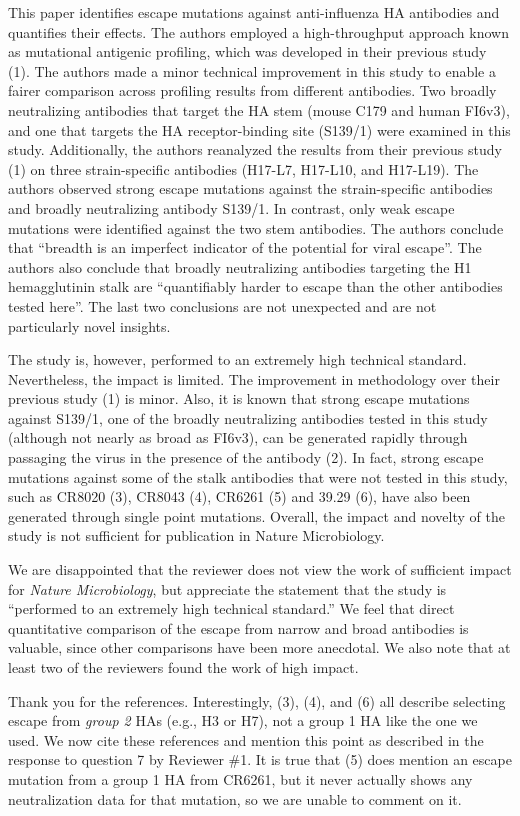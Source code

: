 \documentclass[11pt, oneside]{article}   	%
\begin{document}
This paper identifies escape mutations against anti-influenza HA antibodies and quantifies their effects. The authors employed a high-throughput approach known as mutational antigenic profiling, which was developed in their previous study (1). The authors made a minor technical improvement in this study to enable a fairer comparison across profiling results from different antibodies. Two broadly neutralizing antibodies that target the HA stem (mouse C179 and human FI6v3), and one that targets the HA receptor-binding site (S139/1) were examined in this study. Additionally, the authors reanalyzed the results from their previous study (1) on three strain-specific antibodies (H17-L7, H17-L10, and H17-L19). The authors observed strong escape mutations against the strain-specific antibodies and broadly neutralizing antibody S139/1. In contrast, only weak escape mutations were identified against the two stem antibodies. The authors conclude that ``breadth is an imperfect indicator of the potential for viral escape''. The authors also conclude that broadly neutralizing antibodies targeting the H1 hemagglutinin stalk are ``quantifiably harder to escape than the other antibodies tested here''. The last two conclusions are not unexpected and are not particularly novel insights.

The study is, however, performed to an extremely high technical standard. Nevertheless, the impact is limited. The improvement in methodology over their previous study (1) is minor. Also, it is known that strong escape mutations against S139/1, one of the broadly neutralizing antibodies tested in this study (although not nearly as broad as FI6v3), can be generated rapidly through passaging the virus in the presence of the antibody (2). In fact, strong escape mutations against some of the stalk antibodies that were not tested in this study, such as CR8020 (3), CR8043 (4), CR6261 (5) and 39.29 (6), have also been generated through single point mutations. Overall, the impact and novelty of the study is not sufficient for publication in Nature Microbiology. 

{\color{black}
We are disappointed that the reviewer does not view the work of sufficient impact for \textit{Nature Microbiology}, but appreciate the statement that the study is ``performed to an extremely high technical standard.''
We feel that direct quantitative comparison of the escape from narrow and broad antibodies is valuable, since other comparisons have been more anecdotal.
We also note that at least two of the reviewers found the work of high impact.

Thank you for the references. 
Interestingly, (3), (4), and (6) all describe selecting escape from \emph{group 2} HAs (e.g., H3 or H7), not a group 1 HA like the one we used.
We now cite these references and mention this point as described in the response to question 7 by Reviewer \#1.
It is true that (5) does mention an escape mutation from a group 1 HA from CR6261, but it never actually shows any neutralization data for that mutation, so we are unable to comment on it.
}
\end{document}

